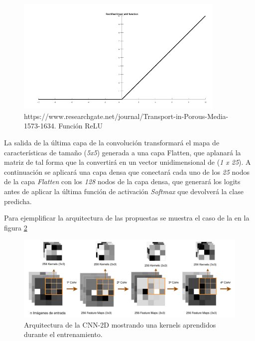 \begin{enumerate}
\begin{enumerate}
                    \begin{figure}[h]
                        \centering
                        \includegraphics[width=10cm]{archivos/CNN/RELUImage}
                        \caption{https://www.researchgate.net/journal/Transport-in-Porous-Media-1573-1634. Función ReLU}
                        \label{RELUImage}
                     \end{figure}

                    La salida de la última capa de la convolución transformará el mapa de características de tamaño (\textit{5x5}) generada a una capa Flatten, que aplanará la matriz de tal forma que la convertirá en un vector unidimensional de (\textit{1 x 25}). A continuación se aplicará una capa densa que conectará cada uno de los \textit{25} nodos de la capa \textit{Flatten} con los \textit{128} nodos de la capa densa, que generará los logits antes de aplicar la última función de activación \textit{Softmax} que devolverá la clase predicha.


                    Para ejemplificar la arquitectura de las  propuestas se muestra el caso de la  en la figura \ref{TASPCNNIMAGE}


                    \begin{figure}[h]
                        \centering
                        \includegraphics[width=15cm]{archivos/CNN/2D/TASCNN}
                        \caption{Arquitectura de la CNN-2D mostrando una  kernels aprendidos durante el entrenamiento.}
                        \label{TASPCNNIMAGE}
                     \end{figure}



\end{enumerate}
\end{enumerate}
